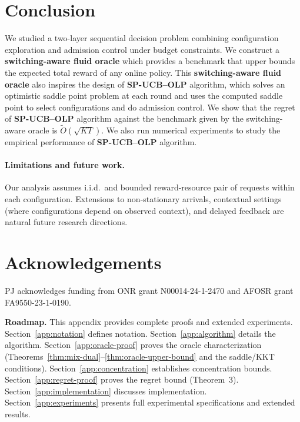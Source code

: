 \documentclass[11pt]{article}
\begin{document}
\section{Conclusion}
\label{sec:conclusion}

We studied a two-layer sequential decision problem combining configuration exploration and admission control under budget constraints. We construct a \textbf{switching-aware fluid oracle} which provides a benchmark that upper bounds the expected total reward of any online policy. This \textbf{switching-aware fluid oracle} also inspires the design of \textbf{SP-UCB--OLP} algorithm, which solves an optimistic saddle point problem at each round and uses the computed saddle point to select configurations and do admission control. We show that the regret of \textbf{SP-UCB--OLP} algorithm against the benchmark given by the switching-aware oracle is $\tilde{O}(\sqrt{KT})$. We also run numerical experiments to study the empirical performance of \textbf{SP-UCB--OLP} algorithm.
\paragraph{Limitations and future work.}
Our analysis assumes i.i.d.\ and bounded reward-resource pair of requests within each configuration. Extensions to non-stationary arrivals, contextual settings (where configurations depend on observed context), and delayed feedback are natural future research directions. 

\section*{Acknowledgements}
PJ acknowledges funding from ONR grant N00014-24-1-2470 and AFOSR grant FA9550-23-1-0190.

\newpage









\newpage
\tableofcontents

\vspace{1em}
\noindent\textbf{Roadmap.} This appendix provides complete proofs and extended experiments. Section~\ref{app:notation} defines notation. Section~\ref{app:algorithm} details the algorithm. Section~\ref{app:oracle-proof} proves the oracle characterization (Theorems~\ref{thm:mix-dual}--\ref{thm:oracle-upper-bound} and the saddle/KKT conditions). Section~\ref{app:concentration} establishes concentration bounds. Section~\ref{app:regret-proof} proves the regret bound (Theorem~3). Section~\ref{app:implementation} discusses implementation. Section~\ref{app:experiments} presents full experimental specifications and extended results.
\end{document}
